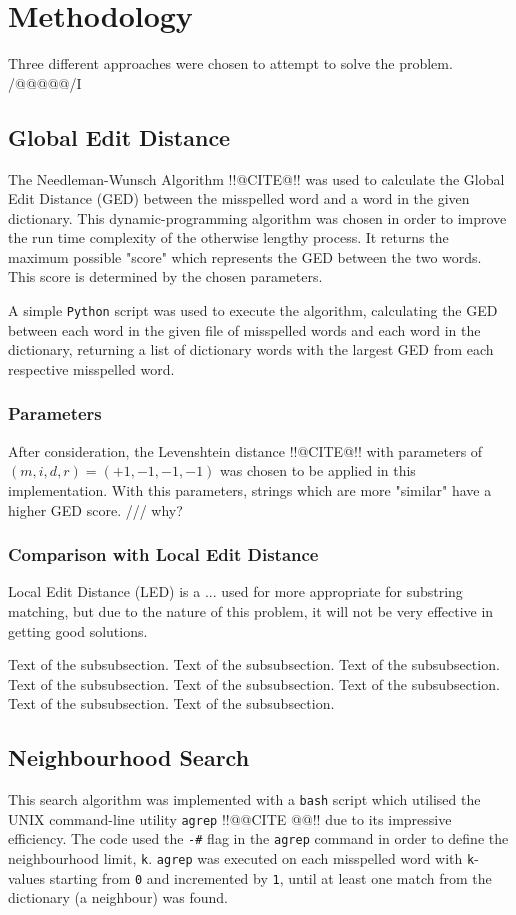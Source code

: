 \documentclass[11pt]{article}
\begin{document}
\section{Methodology}
Three different approaches were chosen to attempt to solve the problem. /@@@@@/I

\subsection{Global Edit Distance}
The Needleman-Wunsch Algorithm !!@CITE@!! was used to calculate the Global Edit Distance (GED) between the misspelled word and a word in the given dictionary. This dynamic-programming algorithm was chosen in order to improve the run time complexity of the otherwise lengthy process. It returns the maximum possible "score" which represents the GED between the two words. This score is determined by the chosen parameters. 

A simple \texttt{Python} script was used to execute the algorithm, calculating the GED between each word in the given file of misspelled words and each word in the dictionary, returning a list of dictionary words with the largest GED from each respective misspelled word.

\subsubsection{Parameters}
After consideration, the Levenshtein distance !!@CITE@!! with parameters of \((m, i, d, r) = (+1, -1, -1, -1)\) was chosen to be applied in this implementation. With this parameters, strings which are more "similar" have a higher GED score. /// why?

\subsubsection{Comparison with Local Edit Distance}
Local Edit Distance (LED) is a ... used for  more appropriate for substring matching, but due to the nature of this problem, it will not be very effective in getting good solutions.

Text of the subsubsection.
Text of the subsubsection.
Text of the subsubsection.
Text of the subsubsection.
Text of the subsubsection.
Text of the subsubsection.
Text of the subsubsection.
Text of the subsubsection.



\subsection{Neighbourhood Search}
This search algorithm was implemented with a \texttt{bash} script which utilised the UNIX command-line utility \texttt{agrep} !!@@CITE @@!! due to its impressive efficiency. The code used the \texttt{-\#} flag in the \texttt{agrep} command in order to define the neighbourhood limit, \texttt{k}. \texttt{agrep} was executed on each misspelled word with \texttt{k}-values starting from \texttt{0} and incremented by \texttt{1}, until at least one match from the dictionary (a neighbour) was found.
\end{document}
